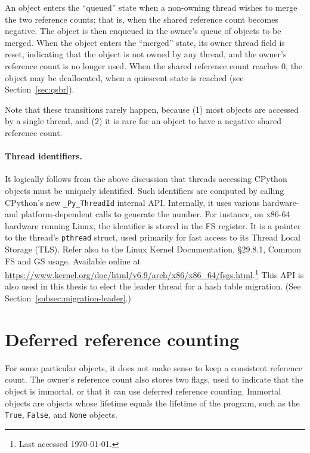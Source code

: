 An object enters the ``queued'' state when a non-owning thread wishes to merge the two reference counts; that is, when the shared reference count becomes negative.
The object is then enqueued in the owner's queue of objects to be merged.
When the object enters the ``merged'' state, its owner thread field is reset, indicating that the object is not owned by any thread, and the owner's reference count is no longer used.
When the shared reference count reaches 0, the object may be deallocated, when a quiescent state is reached (see Section~\ref{sec:qsbr}).

Note that these transitions rarely happen, because (1) most objects are accessed by a single thread, and (2) it is rare for an object to have a negative shared reference count.


\paragraph{Thread identifiers.}
It logically follows from the above discussion that threads accessing CPython objects must be uniquely identified.
Such identifiers are computed by calling CPython's new \texttt{\_Py\_ThreadId} internal API\@.
Internally, it uses various hardware- and platform-dependent calls to generate the number.
For instance, on x86-64 hardware running Linux, the identifier is stored in the FS register.
It is a pointer to the thread's \texttt{pthread} struct, used primarily for fast access to its Thread Local Storage (TLS).
Refer also to the Linux Kernel Documentation, \S29.8.1, Common FS and GS usage.
Available online at \url{https://www.kernel.org/doc/html/v6.9/arch/x86/x86_64/fsgs.html}.\footnote{Last accessed \today.}
This API is also used in this thesis to elect the leader thread for a hash table migration.
(See Section~\ref{subsec:migration-leader}.)


\section{Deferred reference counting}\label{sec:deferred-reference-counting}

For some particular objects, it does not make sense to keep a consistent reference count.
The owner's reference count also stores two flags, used to indicate that the object is immortal, or that it can use deferred reference counting.
Immortal objects are objects whose lifetime equals the lifetime of the program, such as the \texttt{True}, \texttt{False}, and \texttt{None} objects.

